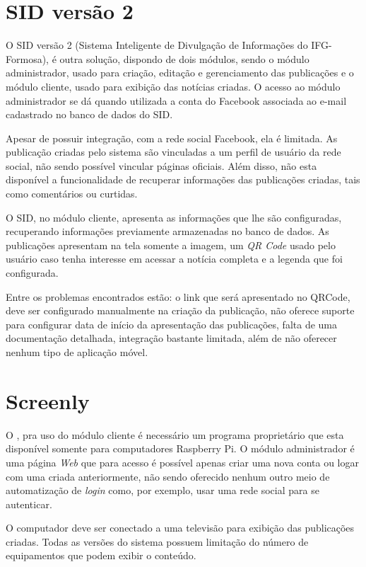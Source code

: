 \section{SID versão 2}
\label{sec:sid}

O SID versão 2 (Sistema Inteligente de Divulgação de Informações do IFG-Formosa), é outra solução, dispondo de dois módulos, sendo o módulo administrador, usado para criação, editação e gerenciamento das publicações e o módulo cliente, usado para exibição das notícias criadas. O acesso ao módulo administrador se dá quando utilizada a conta do Facebook associada ao e-mail cadastrado no banco de dados do SID.

Apesar de possuir integração, com a rede social Facebook, ela é limitada. As publicação criadas pelo sistema são vinculadas a um perfil de usuário da rede social, não sendo possível vincular páginas oficiais. Além disso, não esta disponível a funcionalidade de recuperar informações das publicações criadas, tais como comentários ou curtidas.

O SID, no módulo cliente, apresenta as informações que lhe são configuradas, recuperando informações previamente armazenadas no banco de dados. As publicações apresentam na tela somente a imagem, um \textit{QR Code} usado pelo usuário caso tenha interesse em acessar a notícia completa e a legenda que foi configurada. \citet{sobrinho2017}

Entre os problemas encontrados estão: o link que será apresentado no QRCode, deve ser configurado manualmente na criação da publicação, não oferece suporte para configurar data de início da apresentação das publicações, falta de uma documentação detalhada, integração bastante limitada, além de não oferecer nenhum tipo de aplicação móvel.

\section{Screenly}
O \citet{screenly2017}, pra uso do módulo cliente é necessário um programa proprietário que esta disponível somente para computadores Raspberry Pi. O módulo administrador é uma página \textit{Web} que para acesso é possível apenas criar uma nova conta ou logar com uma criada anteriormente, não sendo oferecido nenhum outro meio de automatização de \textit{login} como, por exemplo, usar uma rede social para se autenticar. 

O computador deve ser conectado a uma televisão para exibição das publicações criadas. Todas as versões do sistema possuem limitação do número de equipamentos que podem exibir o conteúdo.

